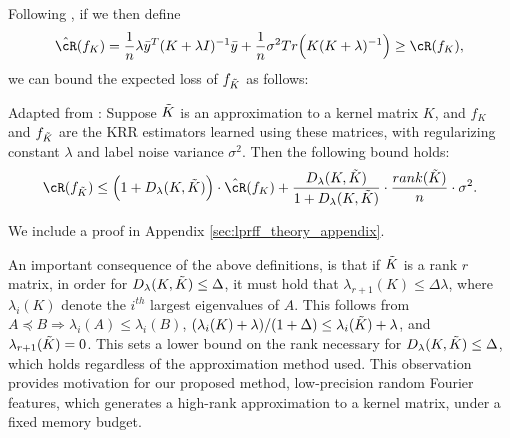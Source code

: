 Following \citet{avron17}, if we then define 
$$\hcR(f_K) = \frac{1}{n}\lambda \by^T(K+\lambda I)^{-1}\by + \frac{1}{n}\sigma^2 Tr\Big(K(K+\lambda)^{-1}\Big) \geq \cR(f_K),$$ 
we can bound the expected loss of $f_{\tilde{K}}$ as follows:

\begin{proposition}{Adapted from \citep{avron17}:}
Suppose $\tilde{K}$ is an approximation to a kernel matrix $K$, and $f_{K}$ and $f_{\tilde{K}}$ are the KRR estimators learned using these matrices, with regularizing constant $\lambda$ and label noise variance $\sigma^2$. Then the following bound holds:
\begin{eqnarray}
\cR(f_{\tK}) \leq \Big(1+D_{\lambda}(K,\tK)\Big)\cdot \hcR(f_K) + \frac{D_{\lambda}(K,\tK)}{1+D_{\lambda}(K,\tK)}\cdot \frac{rank(\tK)}{n}\cdot\sigma^2.
\end{eqnarray}
\end{proposition}
We include a proof in Appendix \ref{sec:lprff_theory_appendix}. 

An important consequence of the above definitions, is that if $\tilde{K}$ is a rank $r$ matrix, 
in order for $D_{\lambda}(K,\tilde{K}) \leq \Delta$, it must hold that $\lambda_{r+1}(K) \leq \Delta \lambda$, where $\lambda_i(K)$ denote the $i^{th}$ largest eigenvalues of $A$.  This follows from $A\preceq B \Rightarrow \lambda_i(A) \leq \lambda_i(B)$, $(\lambda_i(K) + \lambda)/(1+\Delta) \leq \lambda_i(\tilde{K}) + \lambda$, and $\lambda_{r+1}(\tilde{K}) = 0$.  This sets a lower bound on the rank necessary for $D_{\lambda}(K,\tilde{K}) \leq \Delta$, which holds regardless of the approximation method used.  This observation provides motivation for our proposed method, low-precision random Fourier features, which generates a high-rank approximation to a kernel matrix, under a fixed memory budget.

